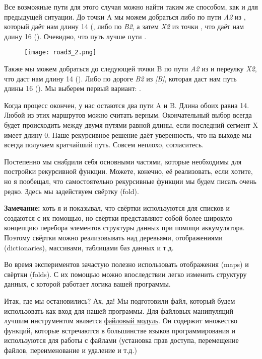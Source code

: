 Все возможные пути для этого случая можно найти таким же способом, как и для предыдущей ситуации.
До точки A мы можем добраться либо по пути \emph{A2} из \ops{[B, X]}, который даёт нам длину 14 (, либо по \emph{B2}, а затем \emph{X2} из точки \ops{[B]}, что даёт нам длину 16 ().
Очевидно, что путь \ops{[B, X, A]} лучше пути \ops{[B, B, X]}.
\begin{figure}[h!]
    \texttt{[image: road3\_2.png]}
\end{figure}

Также мы можем добраться до следующей точки B по пути \emph{A2} из \ops{[B, X]} и переулку \emph{X2}, что даст нам длину 14 ().
Либо по дороге \emph{B2} из \emph{[B]}, которая даст нам путь длины 16 ().
Мы выберем первый вариант: \ops{[B, X, A, X]}.

Когда процесс окончен, у нас остаются два пути A и B.
Длина обоих равна 14.
Любой из этих маршрутов можно считать верным.
Окончательный  выбор всегда будет происходить между двумя путями равной длины, если последний сегмент X имеет длину 0.
Наше рекурсивное решение даёт уверенность, что на выходе мы всегда получаем кратчайший путь.
Совсем неплохо, согласитесь.

Постепенно мы снабдили себя основными частями, которые необходимы для постройки рекурсивной функции.
Можете, конечно, её реализовать, если хотите, но я пообещал, что самостоятельно рекурсивные функции мы будем писать очень редко.
Здесь мы задействуем свёртку (fold).\\
\colorbox{lgray}
{
\begin{minipage}{1.0\linewidth}
    \textbf{Замечание:} хоть я и показывал, что свёртки используются для списков и создаются с их помощью, но свёртки представляют собой более широкую концепцию перебора элементов структуры данных при помощи аккумулятора.
Поэтому свёртки можно реализовывать над деревьями, отображениями (dictionaries), массивами, таблицами баз данных и т.д.

Во время экспериментов зачастую полезно использовать отображения (maps) и свёртки (folds).
С их помощью можно впоследствии легко изменить структуру данных, с которой работает логика вашей программы.
\end{minipage}
}

Итак, где мы остановились?
Ах, да!
Мы подготовили файл, который будем использовать как вход для нашей программы.
Для файловых манипуляций лучшим инструментом является \href{http://erldocs.com/R15B/kernel/file.html}{файловый модуль}.
Он содержит множество функций, которые встречаются в большинстве языков программирования и используются для работы с файлами (установка прав доступа, перемещение файлов, переименование и удаление и т.д.)

